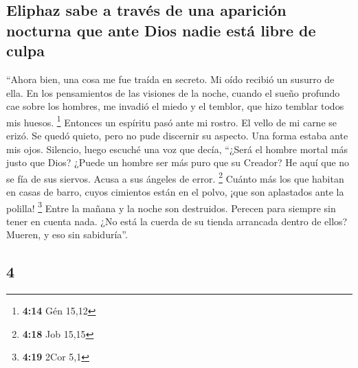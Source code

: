 \begin{paracol}{2}
\hypertarget{eliphaz-sabe-a-travuxe9s-de-una-apariciuxf3n-nocturna-que-ante-dios-nadie-estuxe1-libre-de-culpa}{%
\subsection{Eliphaz sabe a través de una aparición nocturna que ante
Dios nadie está libre de
culpa}\label{eliphaz-sabe-a-travuxe9s-de-una-apariciuxf3n-nocturna-que-ante-dios-nadie-estuxe1-libre-de-culpa}}

 ``Ahora bien, una cosa me fue traída en secreto. Mi oído
recibió un susurro de ella.  En los pensamientos de las
visiones de la noche, cuando el sueño profundo cae sobre los hombres,
 me invadió el miedo y el temblor, que hizo temblar todos
mis huesos. \footnote{\textbf{4:14} Gén 15,12}  Entonces
un espíritu pasó ante mi rostro. El vello de mi carne se erizó.
 Se quedó quieto, pero no pude discernir su aspecto. Una
forma estaba ante mis ojos. Silencio, luego escuché una voz que decía,
 ``¿Será el hombre mortal más justo que Dios? ¿Puede un
hombre ser más puro que su Creador?  He aquí que no se
fía de sus siervos. Acusa a sus ángeles de error. \footnote{\textbf{4:18}
  Job 15,15}  Cuánto más los que habitan en casas de
barro, cuyos cimientos están en el polvo, ¡que son aplastados ante la
polilla! \footnote{\textbf{4:19} 2Cor 5,1}  Entre la
mañana y la noche son destruidos. Perecen para siempre sin tener en
cuenta nada.  ¿No está la cuerda de su tienda arrancada
dentro de ellos? Mueren, y eso sin sabiduría''.

\switchcolumn
\begin{otherlanguage}{english}

\hypertarget{section-7}{%
\section{4}\label{section-7}}


\end{otherlanguage}
\end{paracol}
